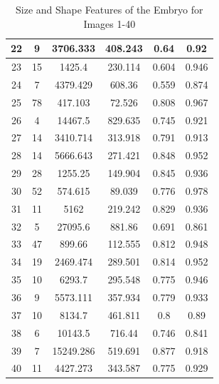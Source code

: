 \documentclass{article}
\begin{document}
\begin{table}[h!]
\begin{tabular}{|c|c|c|c|c|c|}
        22  &  9  &  3706.333  &  408.243  &  0.64  &  0.92 \\ \hline
        23  &  15  &  1425.4  &  230.114  &  0.604  &  0.946 \\ \hline
        24  &  7  &  4379.429  &  608.36  &  0.559  &  0.874 \\ \hline
        25  &  78  &  417.103  &  72.526  &  0.808  &  0.967 \\ \hline
        26  &  4  &  14467.5  &  829.635  &  0.745  &  0.921 \\ \hline
        27  &  14  &  3410.714  &  313.918  &  0.791  &  0.913 \\ \hline
        28  &  14  &  5666.643  &  271.421  &  0.848  &  0.952 \\ \hline
        29  &  28  &  1255.25  &  149.904  &  0.845  &  0.936 \\ \hline
        30  &  52  &  574.615  &  89.039  &  0.776  &  0.978 \\ \hline
        31  &  11  &  5162  &  219.242  &  0.829  &  0.936 \\ \hline
        32  &  5  &  27095.6  &  881.86  &  0.691  &  0.861 \\ \hline
        33  &  47  &  899.66  &  112.555  &  0.812  &  0.948 \\ \hline
        34 & 19 & 2469.474 & 289.501 & 0.814 & 0.952 \\ \hline
        35 & 10 & 6293.7 & 295.548 & 0.775 & 0.946 \\ \hline
        36 & 9 & 5573.111 & 357.934 & 0.779 & 0.933 \\ \hline
        37 & 10 & 8134.7 & 461.811 & 0.8 & 0.89 \\ \hline
        38 & 6 & 10143.5 & 716.44 & 0.746 & 0.841 \\ \hline
        39 & 7 & 15249.286 & 519.691 & 0.877 & 0.918 \\ \hline
        40 & 11 & 4427.273 & 343.587 & 0.775 & 0.929 \\ \hline
    \end{tabular}
    \caption{Size and Shape Features of the Embryo for Images 1-40}
    \label{tab:size_shape_pt1}
\end{table}
\end{document}
